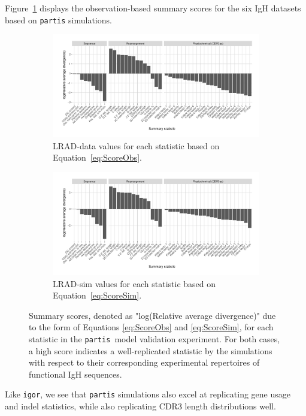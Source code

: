 \documentclass{article}
\newcommand{\partis}{\texttt{partis}}
\begin{document}
Figure~\ref{fig:ObsScoresBCR} displays the observation-based summary scores for the six IgH datasets based on \texttt{partis} simulations.
\begin{figure}
	\begin{subfigure}{\textwidth}
    	\includegraphics[width=\linewidth]{Figures/PartisScores/obs_score_plot.pdf}
    	\caption{LRAD-data values for each statistic based on Equation~\ref{eq:ScoreObs}.}
    	\label{fig:ObsScoresBCR}
	\end{subfigure}
	\begin{subfigure}{\textwidth}
    	\includegraphics[width=\linewidth]{Figures/PartisScores/sim_score_plot.pdf}
    	\caption{LRAD-sim values for each statistic based on Equation~\ref{eq:ScoreSim}.}
    	\label{fig:SimScoresBCR}
	\end{subfigure}
	\caption{Summary scores, denoted as "log(Relative average divergence)" due to the form of Equations \ref{eq:ScoreObs} and \ref{eq:ScoreSim}, for each statistic in the \partis\ model validation experiment. For both cases, a high score indicates a well-replicated statistic by the simulations with respect to their corresponding experimental repertoires of functional IgH sequences.}
\end{figure}
Like \texttt{igor}, we see that \texttt{partis} simulations also excel at replicating gene usage and indel statistics, while also replicating CDR3 length distributions well.
\end{document}
